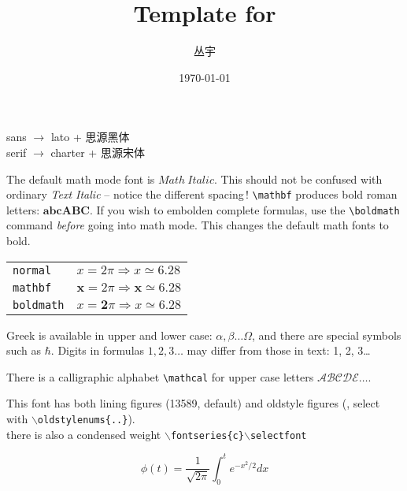 \documentclass[11pt]{article}
\title{Template for \XeLaTeX }
\author{丛宇}
\date{\today}
\begin{document}
\maketitle
\begin{algo}
sans $\to$ lato + 思源黑体\\
serif $\to$ charter + 思源宋体
\end{algo}

The default math mode font is $Math\ Italic$. This should not be
confused with ordinary \emph{Text Italic} -- notice the different spacing\,!
\verb|\mathbf| produces bold roman letters: $ \mathbf{abcABC} $.
If you wish to embolden complete formulas,
use the \verb|\boldmath| command \emph{before} going into math mode.  
This changes the default math fonts to bold. 
 
\begin{tabular}{ll}
\texttt{normal}   & $ x = 2\pi \Rightarrow x \simeq 6.28 $\\
\texttt{mathbf}   & $\mathbf{x} = 2\pi \Rightarrow \mathbf{x} \simeq 6.28 $\\
\texttt{boldmath} & {\boldmath $x = \mathbf{2}\pi \Rightarrow x 
                   \simeq{\mathbf{6.28}}              $}\\
\end{tabular}
\smallskip

Greek is available in upper and lower case:
$\alpha,\beta \dots \Omega$, and there are special
symbols such as $ \hbar$.
Digits in formulas $1, 2, 3\dots$ may differ from those in text: 1, 2, 3\dots

There is a calligraphic alphabet \verb|\mathcal| for upper case letters
$ \mathcal{ABCDE}\dots $.

\noindent
This font has both lining figures (13589, default) and oldstyle figures (, select with {\tt$\backslash$oldstylenums\{..\}}). 
\\
{\selectfont there is also a condensed weight} {\tt$\backslash$fontseries\{c\}$\backslash$selectfont}
 
\begin{equation}
  \phi(t)=\frac{1}{\sqrt{2\pi}}
  \int^t_0 e^{-x^2/2} dx 
\end{equation}
\end{document}
